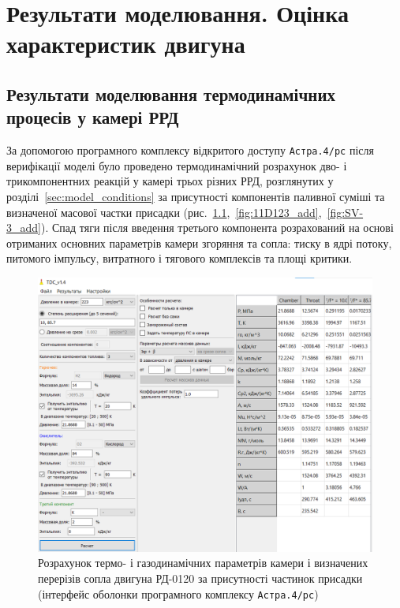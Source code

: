 \chapter{Результати моделювання. Оцінка характеристик двигуна}\label{sec:model_results}

\section{Результати моделювання термодинамічних процесів у камері РРД}




За допомогою програмного комплексу відкритого доступу \texttt{Астра.4/рс} після верифікації моделі було проведено термодинамічний розрахунок дво- і трикомпонентних реакцій у камері трьох різних РРД, розглянутих у розділі~\ref{sec:model_conditions} за присутності компонентів паливної суміші та визначеної масової частки присадки (рис.~\ref{fig:RD-0120_add},~\ref{fig:11D123_add},~\ref{fig:SV-3_add}). Спад тяги після введення третього компонента розрахований на основі отриманих основних параметрів камери згоряння та сопла: тиску в ядрі потоку, питомого імпульсу, витратного і тягового комплексів та площі критики.

\begin{figure}
	\centering
	\includegraphics[width=0.5\textheight, angle=0,origin=c]{chapter_3/RD-0120_add.png}
	\caption{Розрахунок термо- і газодинамічних параметрів камери і визначених перерізів сопла двигуна РД-0120 за присутності частинок присадки (інтерфейс оболонки програмного комплексу \texttt{Астра.4/рс})}
	\label{fig:RD-0120_add}
\end{figure}

